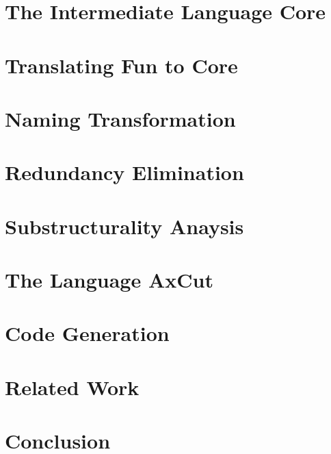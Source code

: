 \documentclass[nonacm]{acmart}
\begin{document}
\section{The Intermediate Language Core}
\label{sec:core}


\section{Translating Fun to Core}
\label{sec:translation}


\section{Naming Transformation}
\label{sec:naming-transformation}


\section{Redundancy Elimination}
\label{sec:redundancy-elimination}


\section{Substructurality Anaysis}
\label{sec:substructurality-analysis}


\section{The Language AxCut}
\label{sec:axcut}


\section{Code Generation}
\label{sec:codegen}


\section{Related Work}
\label{sec:related-work}


\section{Conclusion}
\label{sec:conclusion}



\end{document}
